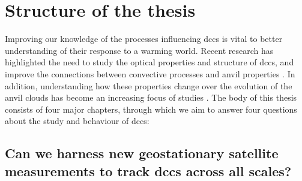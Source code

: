 

\section{Structure of the thesis}

Improving our knowledge of the processes influencing \acrshort{dcc}s is vital to better understanding of their response to a warming world.
Recent research has highlighted the need to study the optical properties and structure of \acrshort{dcc}s, and improve the connections between convective processes and anvil properties \citep{gasparini_opinion_2023}.
In addition, understanding how these properties change over the evolution of the anvil clouds has become an increasing focus of studies \citep{sokol_tropical_2020, wall_life_2018, bouniol_life_2021}.
The body of this thesis consists of four major chapters, through which we aim to answer four questions about the study and behaviour of \acrshort{dcc}s:


\subsection{Can we harness new geostationary satellite measurements to track \acrshort{dcc}s across all scales?}

